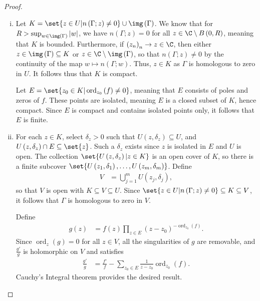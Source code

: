 \documentclass[10pt]{mypackage}
\begin{document}
\begin{proof}\hfill
  \begin{enumerate}[(i)]
    \item Let $K = \set{z\in U | n\left( \Gamma;z \right) \neq 0}\cup \img\left( \Gamma \right)$. We know that for $R > \sup_{w\in\img\left( \Gamma \right)}\left\vert w \right\vert$, we have $n\left( \Gamma;z \right) = 0$ for all $z\in \C\setminus B\left( 0,R \right)$, meaning that $K$ is bounded. Furthermore, if $\left( z_n \right)_n\rightarrow z\in \C$, then either $z\in \img\left( \Gamma \right)\subseteq K$ or $z\in \C\setminus \img\left( \Gamma \right)$, so that $n\left( \Gamma;z \right) \neq 0$ by the continuity of the map $w\mapsto n\left( \Gamma;w \right)$. Thus, $z\in K$ as $\Gamma$ is homologous to zero in $U$. It follows thus that $K$ is compact.\newline

      Let $E = \set{z_0\in K | \operatorname{ord}_{z_0}\left( f \right)\neq 0}$, meaning that $E$ consists of poles and zeros of $f$. These points are isolated, meaning $E$ is a closed subset of $K$, hence compact. Since $E$ is compact and contains isolated points only, it follows that $E$ is finite.
    \item For each $z\in K$, select $\delta_z > 0$ such that $U\left( z,\delta_z \right)\subseteq U$, and $U\left( z,\delta_z \right)\cap E \subseteq \set{z}$. Such a $\delta_z$ exists since $z$ is isolated in $E$ and $U$ is open. The collection $\set{U\left( z,\delta_z \right) | z\in K}$ is an open cover of $K$, so there is a finite subcover $\set{U\left( z_1,\delta_1 \right),\dots,U\left( z_m,\delta_m \right)}$. Define
      \begin{align*}
        V &= \bigcup_{j=1}^{m}U\left( z_j,\delta_j \right),
      \end{align*}
      so that $V$ is open with $K\subseteq V \subseteq U$. Since $\set{z\in U | n\left( \Gamma;z \right)\neq 0}\subseteq K\subseteq V$, it follows that $\Gamma$ is homologous to zero in $V$.\newline

      Define
      \begin{align*}
        g(z) &= f(z)\prod_{z\in E}\left( z-z_0 \right)^{-\operatorname{ord}_{z_0}(f)}.
      \end{align*}
      Since $\operatorname{ord}_z(g) = 0$ for all $z\in V$, all the singularities of $g$ are removable, and $\frac{g'}{g}$ is holomorphic on $V$ and satisfies
      \begin{align*}
        \frac{g'}{g} &= \frac{f'}{f} - \sum_{z_0\in E}\frac{1}{z-z_0}\operatorname{ord}_{z_0}(f).
      \end{align*}
      Cauchy's Integral theorem provides the desired result.
  \end{enumerate}
\end{proof}
\end{document}
